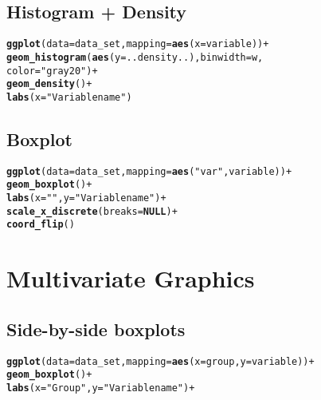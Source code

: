 \documentclass[10pt]{report}\usepackage[]{graphicx}\usepackage[]{color}
\makeatletter
\newcommand{\hlstr}[1]{\textcolor[rgb]{0.192,0.494,0.8}{#1}}%
\newcommand{\hlopt}[1]{\textcolor[rgb]{0,0,0}{#1}}%
\newcommand{\hlstd}[1]{\textcolor[rgb]{0.345,0.345,0.345}{#1}}%
\newcommand{\hlkwa}[1]{\textcolor[rgb]{0.161,0.373,0.58}{\textbf{#1}}}%
\newcommand{\hlkwc}[1]{\textcolor[rgb]{0.333,0.667,0.333}{#1}}%
\newcommand{\hlkwd}[1]{\textcolor[rgb]{0.737,0.353,0.396}{\textbf{#1}}}%
\newenvironment{kframe}{%
 \def\at@end@of@kframe{}%
 \ifinner\ifhmode%
  \def\at@end@of@kframe{\end{minipage}}%
  \begin{minipage}{\columnwidth}%
 \fi\fi%
 \def\FrameCommand##1{\hskip\@totalleftmargin \hskip-\fboxsep
 \colorbox{shadecolor}{##1}\hskip-\fboxsep
     \hskip-\linewidth \hskip-\@totalleftmargin \hskip\columnwidth}%
 \MakeFramed {\advance\hsize-\width
   \@totalleftmargin\z@ \linewidth\hsize
   \@setminipage}}%
 {\par\unskip\endMakeFramed%
 \at@end@of@kframe}
\newenvironment{knitrout}{}{} %
\makeatother
\begin{document}
\begin{multicols}{2}
\subsection*{Histogram + Density}
\begin{knitrout}\small
{}\color{fgcolor}\begin{kframe}
\begin{alltt}
\hlkwd{ggplot}\hlstd{(}\hlkwc{data} \hlstd{= data_set,} \hlkwc{mapping} \hlstd{=} \hlkwd{aes}\hlstd{(}\hlkwc{x} \hlstd{= variable))} \hlopt{+}
  \hlkwd{geom_histogram}\hlstd{(}\hlkwd{aes}\hlstd{(}\hlkwc{y} \hlstd{= ..density..),} \hlkwc{binwidth} \hlstd{= w,}
                 \hlkwc{color} \hlstd{=} \hlstr{"gray20"}\hlstd{)} \hlopt{+}
  \hlkwd{geom_density}\hlstd{()} \hlopt{+}
  \hlkwd{labs}\hlstd{(}\hlkwc{x} \hlstd{=} \hlstr{"Variable name"}\hlstd{)}
\end{alltt}
\end{kframe}
\end{knitrout}
\squeeze
\subsection*{Boxplot}
\begin{knitrout}\small
{}\color{fgcolor}\begin{kframe}
\begin{alltt}
\hlkwd{ggplot}\hlstd{(}\hlkwc{data} \hlstd{= data_set,} \hlkwc{mapping} \hlstd{=} \hlkwd{aes}\hlstd{(}\hlstr{"var"}\hlstd{, variable))} \hlopt{+}
  \hlkwd{geom_boxplot}\hlstd{()} \hlopt{+}
  \hlkwd{labs}\hlstd{(}\hlkwc{x} \hlstd{=} \hlstr{""}\hlstd{,} \hlkwc{y} \hlstd{=} \hlstr{"Variable name"}\hlstd{)} \hlopt{+}
  \hlkwd{scale_x_discrete}\hlstd{(}\hlkwc{breaks} \hlstd{=} \hlkwa{NULL}\hlstd{)} \hlopt{+}
  \hlkwd{coord_flip}\hlstd{()}
\end{alltt}
\end{kframe}
\end{knitrout}

\columnbreak
\section*{Multivariate Graphics}
\subsection*{Side-by-side boxplots}
\begin{knitrout}\small
{}\color{fgcolor}\begin{kframe}
\begin{alltt}
\hlkwd{ggplot}(data = data_set, mapping = \hlkwd{aes}(x = group, y = variable)) +
  \hlkwd{geom_boxplot}() +
  \hlkwd{labs}(x = \hlstr{"Group"}, y = \hlstr{"Variable name"}) +
\end{alltt}
\end{kframe}
\end{knitrout}
\squeeze

\end{multicols}
\end{document}
